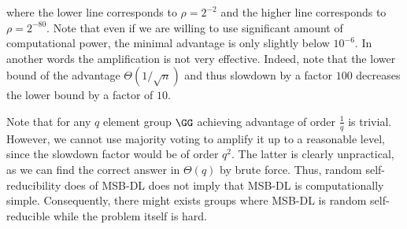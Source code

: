\documentclass{crypto-exercise}
\begin{document}
\begin{solution}
\noindent
where the lower line corresponds to $\rho=2^{-2}$ and the higher line corresponds to $\rho=2^{-80}$. Note that even if we are willing to use significant amount of computational power, the minimal advantage is only slightly below $10^{-6}$. In another words the amplification is not very effective. Indeed, note that the lower bound of the advantage $\Theta(1/\sqrt{n})$ and thus slowdown by a factor $100$ decreases the lower bound by a factor of $10$. 

Note that for any $q$ element group $\GG$ achieving advantage of order $\frac{1}{q}$ is trivial. However, we cannot use majority voting to amplify it up to a reasonable level, since the slowdown factor would be of order $q^2$. The latter is clearly unpractical, as we can find the correct answer in $\Theta(q)$ by brute force. Thus, random self-reducibility does of MSB-DL does not imply that MSB-DL is computationally simple. Consequently, there might exists groups where MSB-DL is random self-reducible while the problem itself is hard.     

\end{solution}
\end{document}

